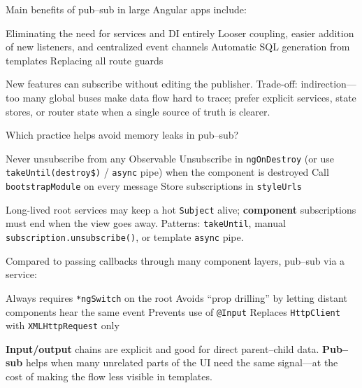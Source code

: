 \question[4]
Main benefits of pub--sub in large Angular apps include:
\begin{choices}
  \choice Eliminating the need for services and DI entirely
  \CorrectChoice Looser coupling, easier addition of new listeners, and centralized event channels
  \choice Automatic SQL generation from templates
  \choice Replacing all route guards
\end{choices}
\begin{solution}
  New features can subscribe without editing the publisher. Trade-off: indirection---too many global buses make data flow hard to trace; prefer explicit services, state stores, or router state when a single source of truth is clearer.
\end{solution}

\question[4]
Which practice helps avoid memory leaks in pub--sub?
\begin{choices}
  \choice Never unsubscribe from any Observable
  \CorrectChoice Unsubscribe in \lstinline[style=tsinline]|ngOnDestroy| (or use \lstinline[style=tsinline]|takeUntil(destroy$)| / \lstinline[style=htmlinline]|async| pipe) when the component is destroyed
  \choice Call \lstinline[style=tsinline]|bootstrapModule| on every message
  \choice Store subscriptions in \texttt{styleUrls}
\end{choices}
\begin{solution}
  Long-lived root services may keep a hot \lstinline[style=tsinline]|Subject| alive; \textbf{component} subscriptions must end when the view goes away. Patterns: \lstinline[style=tsinline]|takeUntil|, manual \lstinline[style=tsinline]|subscription.unsubscribe()|, or template \lstinline[style=htmlinline]|async| pipe.
\end{solution}

\question[4]
Compared to passing callbacks through many component layers, pub--sub via a service:
\begin{choices}
  \choice Always requires \lstinline[style=htmlinline]|*ngSwitch| on the root
  \CorrectChoice Avoids ``prop drilling'' by letting distant components hear the same event
  \choice Prevents use of \lstinline[style=tsinline]|@Input|
  \choice Replaces \texttt{HttpClient} with \texttt{XMLHttpRequest} only
\end{choices}
\begin{solution}
  \textbf{Input/output} chains are explicit and good for direct parent--child data. \textbf{Pub--sub} helps when many unrelated parts of the UI need the same signal---at the cost of making the flow less visible in templates.
\end{solution}

